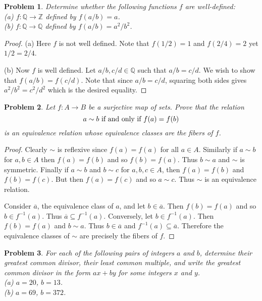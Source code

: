 \documentclass{article}
\newtheorem{problem}{Problem}
\begin{document}

\begin{problem}
Determine whether the following functions $f$ are well-defined:\\
(a) $f : \mathbb{Q} \to \mathbb{Z}$ defined by $f(a/b) = a$.\\
(b) $f : \mathbb{Q} \to \mathbb{Q}$ defined by $f(a/b) = a^2/b^2$.
\end{problem}
\begin{proof}
(a) Here $f$ is not well defined. Note that $f(1/2) = 1$ and $f(2/4) = 2$ yet $1/2 = 2/4$.\newline

(b) Now $f$ is well defined. Let $a/b, c/d \in \mathbb{Q}$ such that $a/b = c/d$. We wish to show that $f(a/b) = f(c/d)$. Note that since $a/b = c/d$, squaring both sides gives $a^2/b^2 = c^2/d^2$ which is the desired equality.
\end{proof}

\begin{problem}
Let $f : A \to B$ be a surjective map of sets. Prove that the relation
\[
a \sim b \textup{ if and only if } f(a) = f(b)
\]
is an equivalence relation whose equivalence classes are the fibers of $f$.
\end{problem}
\begin{proof}
Clearly $\sim$ is reflexive since $f(a) = f(a)$ for all $a \in A$. Similarly if $a \sim b$ for $a,b \in A$ then $f(a) = f(b)$ and so $f(b) = f(a)$. Thus $b \sim a$ and $\sim$ is symmetric. Finally if $a \sim b$ and $b \sim c$ for $a,b,c \in A$, then $f(a) = f(b)$ and $f(b) = f(c)$. But then $f(a) = f(c)$ and so $a \sim c$. Thus $\sim$ is an equivalence relation.\newline

Consider $\overline{a}$, the equivalence class of $a$, and let $b \in \overline{a}$. Then $f(b) = f(a)$ and so $b \in f^{-1}(a)$. Thus $\overline{a} \subseteq f^{-1}(a)$. Conversely, let $b \in f^{-1}(a)$. Then $f(b) = f(a)$ and $b \sim a$. Thus $b \in \overline{a}$ and $f^{-1}(a) \subseteq \overline{a}$. Therefore the equivalence classes of $\sim$ are precisely the fibers of $f$.
\end{proof}

\begin{problem}
For each of the following pairs of integers $a$ and $b$, determine their greatest common divisor, their least common multiple, and write the greatest common divisor in the form $ax + by$ for some integers $x$ and $y$.\\
(a) $a = 20$, $b=13$.\\
(b) $a = 69$, $b=372$.
\end{problem}
\end{document}
